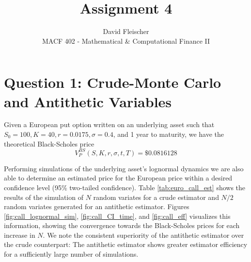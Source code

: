 \documentclass[12pt]{article}
\newlength\tindent
\renewcommand{\indent}{\hspace*{\tindent}}
\begin{document}
 
 
\title{Assignment 4}
\author{David Fleischer\\ 
MACF 402 - Mathematical \& Computational Finance II}
 
\maketitle

\section{Question 1: {\normalfont Crude-Monte Carlo and Antithetic Variables}}

\indent Given a European put option written on an underlying asset such that $S_0 = 100, K = 40, r = 0.0175, \sigma = 0.4$, and 1 year to maturity, we have the theoretical Black-Scholes price
\begin{equation*}
	V^{BS}_P(S,K,r,\sigma,t,T) = \$0.0816128
\end{equation*}

\indent Performing simulations of the underlying asset's lognormal dynamics we are also able to determine an estimated price for the European price within a desired confidence level (95\% two-tailed confidence). Table \ref{tab:euro_call_est} shows the results of the simulation of $N$ random variates for a crude estimator and $N/2$ random variates generated for an antithetic estimator. Figures \ref{fig:call_lognormal_sim}, \ref{fig:call_CI_time}, and \ref{fig:call_eff} visualizes this information, showing the convergence towards the Black-Scholes prices for each increase in $N$. We note the consistent superiority of the antithetic estimator over the crude counterpart: The antithetic estimator shows greater estimator efficiency for a sufficiently large number of simulations.

{\footnotesize
{}
}
\end{document}
